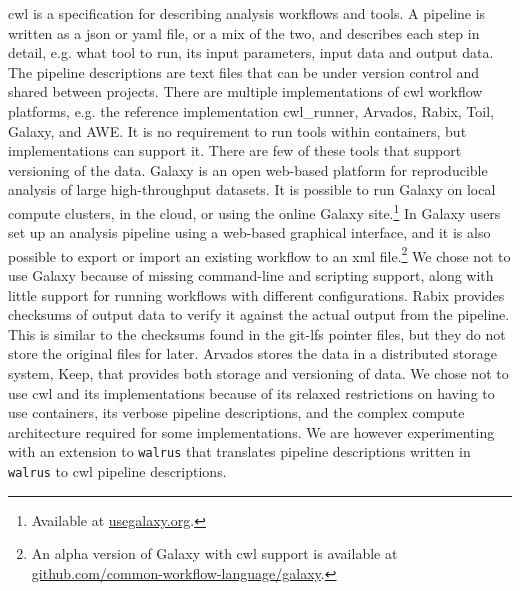 \gls{cwl} is a specification for describing analysis workflows and
tools.\cite{commonwl} A pipeline is written as a \gls{json} or \gls{yaml} file,
or a mix of the two, and describes each step in detail, e.g. what tool to run,
its input parameters, input data and output data. The pipeline descriptions
are text files that can be under version control and shared between projects. There
are multiple implementations of \gls{cwl} workflow platforms, e.g. the reference
implementation cwl\_runner\cite{cwl}, Arvados\cite{arvados}, Rabix\cite{rabix},
Toil\cite{toil}, Galaxy\cite{goecks2010galaxy}, and AWE.\cite{awe} It is no
requirement to run tools within containers, but implementations can support it.
There are few of these tools that support versioning of the data.  Galaxy is an
open web-based platform for reproducible analysis of large high-throughput
datasets.\cite{goecks2010galaxy} It is possible to run Galaxy on local compute
clusters, in the cloud, or using the online Galaxy site.\footnote{Available at
\url{usegalaxy.org}.} In Galaxy users set up an analysis pipeline using a
web-based graphical interface, and it is also possible to export or import an
existing workflow to an \gls{xml} file.\footnote{An alpha version of Galaxy with
\gls{cwl} support is available at
\url{github.com/common-workflow-language/galaxy}.}  We chose not to use Galaxy
because of missing command-line and scripting support, along with little support
for running workflows with different configurations.\cite{spjuth2015experiences}
Rabix provides checksums of output data to verify it against the actual output
from the pipeline. This is similar to the checksums found in the git-lfs pointer
files, but they do not store the original files for later. Arvados stores the
data in a distributed storage system, Keep, that provides both storage and
versioning of data. We chose not to use \gls{cwl} and its implementations
because of its relaxed restrictions on having to use containers, its verbose
pipeline descriptions, and the complex compute architecture required for some
implementations. We are however experimenting with an extension to
\texttt{walrus} that translates pipeline descriptions written in \texttt{walrus}
to \gls{cwl} pipeline descriptions. 

